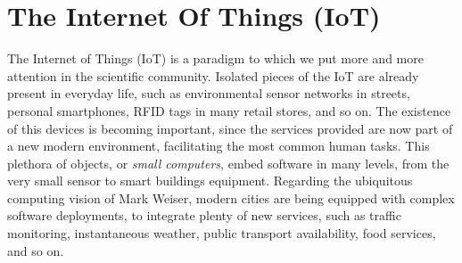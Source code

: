 \chapter{The Internet Of Things (IoT)}
\label{sec:IoT}

The Internet of Things (IoT) is a paradigm to which we put more and more attention in the scientific community\cite{atzori2010iotsurvey}.
Isolated pieces of the IoT are already present in everyday life, such as environmental sensor networks in streets, personal smartphones, RFID tags in many retail stores, and so on.
The existence of this devices is becoming important, since the services provided are now part of a new modern environment, facilitating the most common human tasks.
This plethora of objects, or \textit{small computers}, embed software in many levels, from the very small sensor to smart buildings equipment.
Regarding the ubiquitous computing vision of Mark Weiser\cite{weiser1999ubiquitous}, modern cities are being equipped with complex software deployments, to integrate plenty of new services, such as traffic monitoring, instantaneous weather, public transport availability, food services, and so on.





